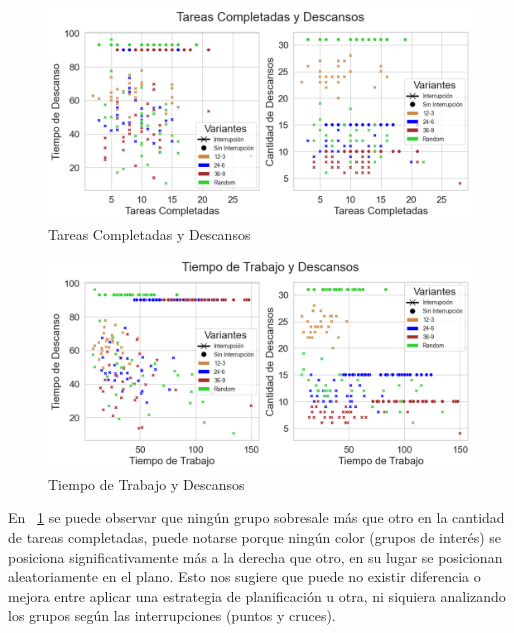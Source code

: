 \documentclass[10pt,a4paper,twocolumn]{article}
\begin{document}
\begin{figure}[H]
    \includegraphics[height=.80\linewidth, width=.97\linewidth]{tareas_completadas_y_descansos.png}
    \caption{Tareas Completadas y Descansos}
    \label{fig3a}
\end{figure}
\begin{figure}[H]
    \includegraphics[height=.80\linewidth, width=.97\linewidth]{Tiempo_de_trabajo_y_descansos.png}
    \caption{Tiempo de Trabajo y Descansos}
    \label{fig3b}
\end{figure}


En ~\ref{fig3a} se puede observar que ningún grupo sobresale más que otro en la cantidad de tareas completadas, puede notarse porque ningún color (grupos de inter\'es) se posiciona significativamente m\'as a la derecha que otro, en su lugar se posicionan aleatoriamente en el plano. Esto nos sugiere que puede no existir diferencia o mejora entre aplicar una estrategia de planificaci\'on u otra, ni siquiera analizando los grupos seg\'un las interrupciones (puntos y cruces).
\end{document}
